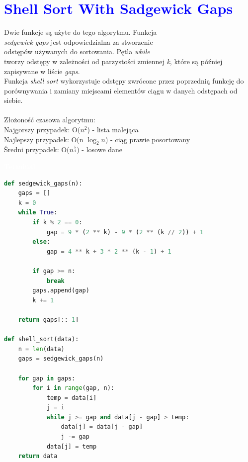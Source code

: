 \documentclass{article}
\begin{document}
	\section*{\textcolor{blue}{Shell Sort With Sadgewick Gaps}}
	\begin{multicols}{2}
		\noindent Dwie funkcje są użyte do tego algorytmu. Funkcja \\ \textit{sedgewick gaps} jest odpowiedzialna za stworzenie \\odstępów używanych do sortowania. Pętla \textit{while} \\tworzy odstępy w zależności od parzystości zmiennej \textit{k}, które są później zapisywane w liście \textit{gaps}. \\Funkcja \textit{shell sort} wykorzystuje odstępy zwrócone przez poprzednią funkcję do porównywania i zamiany miejscami elementów ciągu w danych odstępach od \\siebie. \\
		\\Złożoność czasowa algorytmu: \\Najgorszy przypadek: O($n^2$) - lista malejąca \\Najlepszy przypadek: O(n $\log_2 n$) - ciąg prawie posortowany \\Średni przypadek: O($n^{\frac{5}{4}}$) - losowe dane
		
		\noindent 
		\begin{tcolorbox}[colback=black,colframe=gray!50!,arc=3mm,boxrule=0pt,left=0pt,right=0pt,width=\linewidth]
			\textcolor{white}{\textbf{\textsf{Terminal}}}\\
			
			\begin{lstlisting}[language=Python]
def sedgewick_gaps(n):
	gaps = []
	k = 0
	while True:
		if k % 2 == 0:
			gap = 9 * (2 ** k) - 9 * (2 ** (k // 2)) + 1
		else:
			gap = 4 ** k + 3 * 2 ** (k - 1) + 1

		if gap >= n:
			break
		gaps.append(gap)
		k += 1

	return gaps[::-1]

def shell_sort(data):
	n = len(data)
	gaps = sedgewick_gaps(n)

	for gap in gaps:
		for i in range(gap, n):
			temp = data[i]
			j = i
			while j >= gap and data[j - gap] > temp:
				data[j] = data[j - gap]
				j -= gap
			data[j] = temp
	return data
			\end{lstlisting}
			
		\end{tcolorbox}
	\end{multicols}
	
\end{document}
